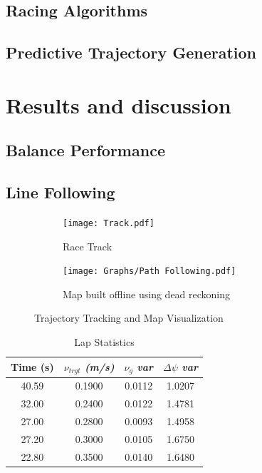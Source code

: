         \subsection{Racing Algorithms}

        \subsection{Predictive Trajectory Generation}
    
    \pagebreak{}


  \section{Results and discussion} %
    \subsection{Balance Performance}
    \subsection{Line Following}
    \begin{figure}[H]
        \centering
        \begin{subfigure}[c]{0.35\textwidth}
            \texttt{[image: Track.pdf]}
            \caption{Race Track}
        \end{subfigure}
        \hfill
        \begin{subfigure}[c]{0.6\textwidth}
            \texttt{[image: Graphs/Path Following.pdf]}
            \caption{Map built offline using dead reckoning}
        \end{subfigure}
        \caption{Trajectory Tracking and Map Visualization}
        \label{fig:TrajTrack}
    \end{figure}

    \begin{table}[h]
        \centering
        \begin{tabular}{cccc}
            \toprule
            \textbf{Time (s)} & $\nu_{trgt}$ \textit{(m/s)} & $\nu_g$ \textit{var}& $\Delta\psi$ \textit{var} \\  
            \midrule
            40.59 & 0.1900 & 0.0112 & 1.0207 \\  
            32.00 & 0.2400 & 0.0122 & 1.4781 \\  
            27.00 & 0.2800 & 0.0093 & 1.4958 \\  
            27.20 & 0.3000 & 0.0105 & 1.6750 \\  
            22.80 & 0.3500 & 0.0140 & 1.6480 \\  
            \bottomrule
        \end{tabular}
        \caption{Lap Statistics}
        \label{tab:lap_stats}
    \end{table}


